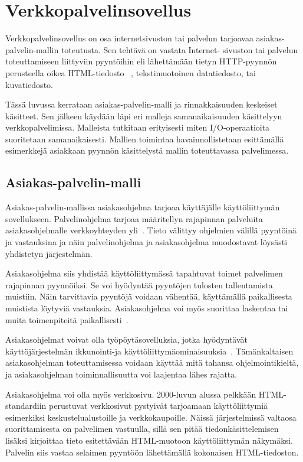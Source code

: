 \documentclass[finnish]{tktltiki2}
\theoremstyle{definition}
\theoremstyle{remark}
\begin{document}
\section{Verkkopalvelinsovellus}\label{vps}
Verkkopalvelinsovellus on osa internetsivuston tai palvelun tarjoavaa
asiakas-palvelin-mallin toteutusta. 
Sen tehtävä on vastata Internet-
sivuston tai palvelun toteuttamiseen
liittyviin pyyntöihin eli lähettämään tietyn HTTP-pyynnön
perusteella oikea HTML-tiedosto~\cite{Berners-Lee_1994}
, tekstimuotoinen datatiedosto, tai kuvatiedosto.

Tässä luvussa kerrataan
asiakas-palvelin-malli ja rinnakkaisuuden keskeiset käsitteet.
Sen jälkeen käydään läpi eri malleja samanaikaisuuden käsittelyyn 
verkkopalvelimissa. Malleista tutkitaan erityisesti miten I/O-operaatioita
suoritetaan samanaikaisesti. Mallien toimintaa havainnollistetaan
esittämällä esimerkkejä asiakkaan pyynnön käsittelystä mallin
toteuttavassa palvelimessa.

\subsection{Asiakas-palvelin-malli}
Asiakas-palvelin-mallissa
asiakasohjelma tarjoaa käyttäjälle käyttöliittymän sovellukseen. Palvelinohjelma
tarjoaa määritellyn rajapinnan
palveluita asiakasohjelmalle verkkoyhteyden yli~\cite{sinha_client-server_1992}.
Tieto välittyy ohjelmien välillä pyyntöinä ja vastauksina ja näin palvelinohjelma ja
asiakasohjelma
muodostavat löysästi yhdistetyn järjestelmän.

Asiakasohjelma siis yhdistää käyttöliittymässä tapahtuvat toimet palvelimen
rajapinnan pyynnöiksi. Se voi hyödyntää pyyntöjen tulosten tallentamista
muistiin. Näin tarvittavia pyyntöjä voidaan vähentää, käyttämällä
paikallisesta muistista löytyviä vastauksia.
Asiakasohjelma voi myös suorittaa
laskentaa tai muita toimenpiteitä paikallisesti~\cite{sinha_client-server_1992}.

Asiakasohjelmat voivat olla työpöytäsovelluksia, jotka hyödyntävät käyttöjärjestelmän
ikkunointi-ja käyttöliittymäominaisuuksia~\cite{sinha_client-server_1992}.
Tämänkaltaisen asiakasohjelman toteuttamisessa voidaan käyttää mitä tahansa ohjelmointikieltä,
ja asiakasohjelman toiminnallisuutta voi laajentaa lähes rajatta.

Asiakasohjelma voi olla myös verkkosivu. 2000-luvun alussa
pelkkään HTML-standardiin perustuvat verkkosivut pystyivät
tarjoamaan käyttöliittymiä esimerkiksi keskustelualustoille ja verkkokaupoille.
Näissä järjestelmissä valtaosa suorittamisesta on palvelimen vastuulla,
sillä sen pitää tiedonkäsittelemisen lisäksi kirjoittaa tieto
esitettävään HTML-muotoon käyttöliittymän näkymäksi. Palvelin
siis vastaa selaimen pyyntöön lähettämällä kokonaisen HTML-tiedoston.
\end{document}
